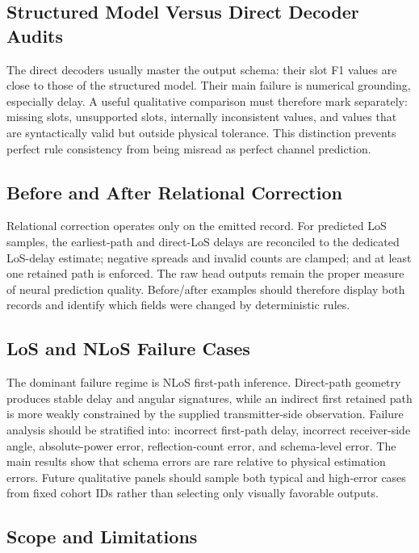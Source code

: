 \subsection{Structured Model Versus Direct Decoder Audits}

The direct decoders usually master the output schema: their slot F1 values are close to those of the
structured model. Their main failure is numerical grounding, especially delay. A useful qualitative
comparison must therefore mark separately: missing slots, unsupported slots, internally inconsistent
values, and values that are syntactically valid but outside physical tolerance. This distinction prevents
perfect rule consistency from being misread as perfect channel prediction.

\subsection{Before and After Relational Correction}

Relational correction operates only on the emitted record. For predicted LoS samples, the earliest-path
and direct-LoS delays are reconciled to the dedicated LoS-delay estimate; negative spreads and invalid
counts are clamped; and at least one retained path is enforced. The raw head outputs remain the proper
measure of neural prediction quality. Before/after examples should therefore display both records and
identify which fields were changed by deterministic rules.

\subsection{LoS and NLoS Failure Cases}

The dominant failure regime is NLoS first-path inference. Direct-path geometry produces stable delay
and angular signatures, while an indirect first retained path is more weakly constrained by the supplied
transmitter-side observation. Failure analysis should be stratified into: incorrect first-path delay,
incorrect receiver-side angle, absolute-power error, reflection-count error, and schema-level error.
The main results show that schema errors are rare relative to physical estimation errors. Future
qualitative panels should sample both typical and high-error cases from fixed cohort IDs rather than
selecting only visually favorable outputs.

\subsection{Scope and Limitations}

